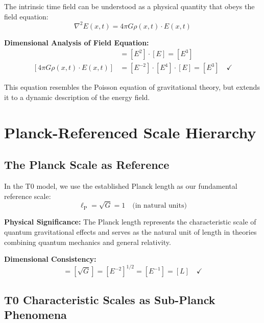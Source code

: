 \documentclass[12pt,a4paper]{report}
\newcommand{\lP}{\ell_{\text{P}}}         %
\begin{document}
	The intrinsic time field can be understood as a physical quantity that obeys the field equation:
	\begin{equation}
		\nabla^2 E(x,t) = 4\pi G \rho(x,t) \cdot E(x,t)
		\label{eq:energy_field_equation}
	\end{equation}
	
	\textbf{Dimensional Analysis of Field Equation:}
	\begin{align}
		[\nabla^2 E(x,t)] &= [E^2] \cdot [E] = [E^3] \\
		[4\pi G \rho(x,t) \cdot E(x,t)] &= [E^{-2}] \cdot [E^4] \cdot [E] = [E^3] \quad \checkmark
	\end{align}
	
	This equation resembles the Poisson equation of gravitational theory, but extends it to a dynamic description of the energy field.
	
	\section{Planck-Referenced Scale Hierarchy}\label{sec:planck_referenced_scales}
	
	\subsection{The Planck Scale as Reference}\label{subsec:planck_reference}
	
	In the T0 model, we use the established Planck length as our fundamental reference scale:
	\begin{equation}
		\boxed{\lP = \sqrt{G} = 1 \quad \text{(in natural units)}}
		\label{eq:planck_length_reference}
	\end{equation}
	
	\textbf{Physical Significance:} The Planck length represents the characteristic scale of quantum gravitational effects and serves as the natural unit of length in theories combining quantum mechanics and general relativity.
	
	\textbf{Dimensional Consistency:}
	\begin{equation}
		[\lP] = [\sqrt{G}] = [E^{-2}]^{1/2} = [E^{-1}] = [L] \quad \checkmark
	\end{equation}
	
	\subsection{T0 Characteristic Scales as Sub-Planck Phenomena}\label{subsec:t0_sub_planck}
	
\end{document}
